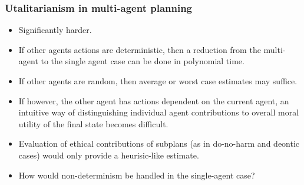 \documentclass{beamer}
\begin{document}
\begin{frame}
\frametitle{Utalitarianism in multi-agent planning}

\begin{itemize}
\item Significantly harder.
\item If other agents actions are deterministic, then a reduction from the multi-agent to the single agent case can be done in polynomial time.
\item If other agents are random, then average or worst case estimates may suffice.
\item If however, the other agent has actions dependent on the current agent, an intuitive way of distinguishing individual agent contributions to overall moral utility of the final state becomes difficult.
\item Evaluation of ethical contributions of subplans (as in do-no-harm and deontic cases) would only provide a heurisic-like estimate.
\item How would non-determinism be handled in the single-agent case?
\end{itemize}



\end{frame}
\end{document}
